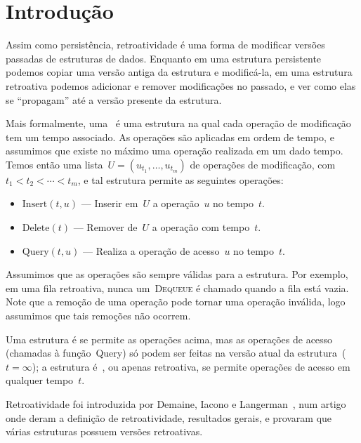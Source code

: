 \documentclass[main.tex]{subfiles}
\begin{document}
\chapter*{Introdução}

Assim como persistência, retroatividade é uma forma de modificar versões passadas de estruturas de dados. Enquanto em uma estrutura persistente podemos copiar uma versão antiga da estrutura e modificá-la, em uma estrutura retroativa podemos adicionar e remover modificações no passado, e ver como elas se ``propagam'' até a versão presente da estrutura.

Mais formalmente, uma~ é uma estrutura na qual cada operação de modificação tem um tempo associado. As operações são aplicadas em ordem de tempo, e assumimos que existe no máximo uma operação realizada em um dado tempo. Temos então uma lista~${U = (u_{t_1}, \ldots, u_{t_m})}$ de operações de modificação, com~${t_1 < t_2 < \cdots < t_m}$, e tal estrutura permite as seguintes operações:

\begin{itemize}
	\item $\text{Insert}(t, u)$ --- Inserir em~$U$ a operação~$u$ no tempo~$t$.
	\item $\text{Delete}(t)$ --- Remover de~$U$ a operação com tempo~$t$.
	\item $\text{Query}(t, u)$ --- Realiza a operação de acesso~$u$ no tempo~$t$.
\end{itemize}

Assumimos que as operações são sempre válidas para a estrutura. Por exemplo, em uma fila retroativa, nunca um~\textsc{Dequeue} é chamado quando a fila está vazia. Note que a remoção de uma operação pode tornar uma operação inválida, logo assumimos que tais remoções não ocorrem.

Uma estrutura é  se permite as operações acima, mas as operações de acesso (chamadas à função~Query) só podem ser feitas na versão atual da estrutura~(${t = \infty}$); a estrutura é~, ou apenas retroativa, se permite operações de acesso em qualquer tempo~$t$.

Retroatividade foi introduzida por Demaine, Iacono e Langerman~\cite{DemaineIL2007}, num artigo onde deram a definição de retroatividade, resultados gerais, e provaram que várias estruturas possuem versões retroativas.
\end{document}
